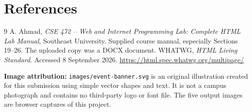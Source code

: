 \documentclass[11pt,a4paper]{article}
\begin{document}
\section{References}
\begingroup\renewcommand{\section}[2]{}
\begin{thebibliography}{9}
 A. Ahmad, \emph{CSE 472 -- Web and Internet Programming Lab: Complete HTML Lab Manual}, Southeast University. Supplied course manual, especially Sections 19--26. The uploaded copy was a DOCX document.
 WHATWG, \emph{HTML Living Standard}. Accessed 8 September 2026. \url{https://html.spec.whatwg.org/multipage/}
\end{thebibliography}\endgroup
\textbf{Image attribution:} \texttt{images/event-banner.svg} is an original illustration created for this submission using simple vector shapes and text. It is not a campus photograph and contains no third-party logo or font file. The five output images are browser captures of this project.
\end{document}
